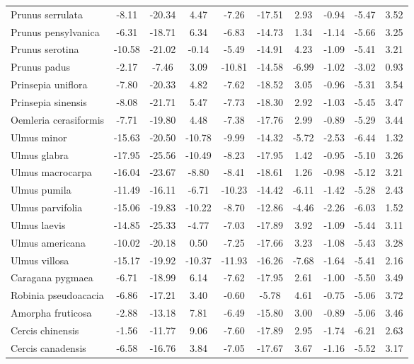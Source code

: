 \documentclass[11pt]{article}
\begin{document}
\begin{longtable}{p{1.50in}c{0.32in}c{0.32in}c{0.32in}c{0.32in}c{0.32in}c{0.32in}c{0.2in}c{0.3in}c{0.1in}}
  Prunus serrulata & -8.11 & -20.34 & 4.47 & -7.26 & -17.51 & 2.93 & -0.94 & -5.47 & 3.52 \\ 
  Prunus pensylvanica & -6.31 & -18.71 & 6.34 & -6.83 & -14.73 & 1.34 & -1.14 & -5.66 & 3.25 \\ 
  Prunus serotina & -10.58 & -21.02 & -0.14 & -5.49 & -14.91 & 4.23 & -1.09 & -5.41 & 3.21 \\ 
  Prunus padus & -2.17 & -7.46 & 3.09 & -10.81 & -14.58 & -6.99 & -1.02 & -3.02 & 0.93 \\ 
  Prinsepia uniflora & -7.80 & -20.33 & 4.82 & -7.62 & -18.52 & 3.05 & -0.96 & -5.31 & 3.54 \\ 
  Prinsepia sinensis & -8.08 & -21.71 & 5.47 & -7.73 & -18.30 & 2.92 & -1.03 & -5.45 & 3.47 \\ 
  Oemleria cerasiformis & -7.71 & -19.80 & 4.48 & -7.38 & -17.76 & 2.99 & -0.89 & -5.29 & 3.44 \\ 
  Ulmus minor & -15.63 & -20.50 & -10.78 & -9.99 & -14.32 & -5.72 & -2.53 & -6.44 & 1.32 \\ 
  Ulmus glabra & -17.95 & -25.56 & -10.49 & -8.23 & -17.95 & 1.42 & -0.95 & -5.10 & 3.26 \\ 
  Ulmus macrocarpa & -16.04 & -23.67 & -8.80 & -8.41 & -18.61 & 1.26 & -0.98 & -5.12 & 3.21 \\ 
  Ulmus pumila & -11.49 & -16.11 & -6.71 & -10.23 & -14.42 & -6.11 & -1.42 & -5.28 & 2.43 \\ 
  Ulmus parvifolia & -15.06 & -19.83 & -10.22 & -8.70 & -12.86 & -4.46 & -2.26 & -6.03 & 1.52 \\ 
  Ulmus laevis & -14.85 & -25.33 & -4.77 & -7.03 & -17.89 & 3.92 & -1.09 & -5.44 & 3.11 \\ 
  Ulmus americana & -10.02 & -20.18 & 0.50 & -7.25 & -17.66 & 3.23 & -1.08 & -5.43 & 3.28 \\ 
  Ulmus villosa & -15.17 & -19.92 & -10.37 & -11.93 & -16.26 & -7.68 & -1.64 & -5.41 & 2.16 \\ 
  Caragana pygmaea & -6.71 & -18.99 & 6.14 & -7.62 & -17.95 & 2.61 & -1.00 & -5.50 & 3.49 \\ 
  Robinia pseudoacacia & -6.86 & -17.21 & 3.40 & -0.60 & -5.78 & 4.61 & -0.75 & -5.06 & 3.72 \\ 
  Amorpha fruticosa & -2.88 & -13.18 & 7.81 & -6.49 & -15.80 & 3.00 & -0.89 & -5.06 & 3.46 \\ 
  Cercis chinensis & -1.56 & -11.77 & 9.06 & -7.60 & -17.89 & 2.95 & -1.74 & -6.21 & 2.63 \\ 
  Cercis canadensis & -6.58 & -16.76 & 3.84 & -7.05 & -17.67 & 3.67 & -1.16 & -5.52 & 3.17 \\ 

\end{longtable}
\end{document}
